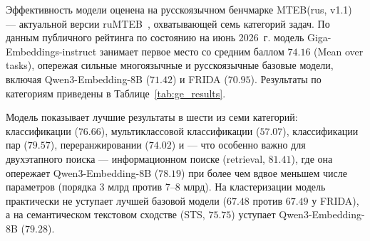 Эффективность модели оценена на русскоязычном бенчмарке MTEB(rus, v1.1) --- актуальной версии ruMTEB~\cite{snegirev2025rumteb}, охватывающей семь категорий задач. По данным публичного рейтинга по состоянию на июнь 2026~г. модель Giga-Embeddings-instruct занимает первое место со средним баллом $74.16$ (Mean over tasks), опережая сильные многоязычные и русскоязычные базовые модели, включая Qwen3-Embedding-8B ($71.42$) и FRIDA ($70.95$). Результаты по категориям приведены в Таблице~\ref{tab:ge_results}.

Модель показывает лучшие результаты в шести из семи категорий: классификации ($76.66$), мультиклассовой классификации ($57.07$), классификации пар ($79.57$), переранжировании ($74.02$) и --- что особенно важно для двухэтапного поиска --- информационном поиске (retrieval, $81.41$), где она опережает Qwen3-Embedding-8B ($78.19$) при более чем вдвое меньшем числе параметров (порядка 3 млрд против 7--8 млрд). На кластеризации модель практически не уступает лучшей базовой модели ($67.48$ против $67.49$ у FRIDA), а на семантическом текстовом сходстве (STS, $75.75$) уступает Qwen3-Embedding-8B ($79.28$).

\begin{table}[H]
    \centering
    \caption{Сравнение GigaEmbeddings с базовыми моделями на бенчмарке MTEB(rus, v1.1) по семи категориям задач (по данным публичного рейтинга, июнь 2026~г.). Лучший результат в каждом столбце выделен жирным. Обозначения: Cls~--- классификация, Clust~--- кластеризация, MLCls~--- мультиклассовая классификация, PairCls~--- классификация пар, Rerank~--- переранжирование, Retr~--- информационный поиск.}
    \label{tab:ge_results}
\end{table}

